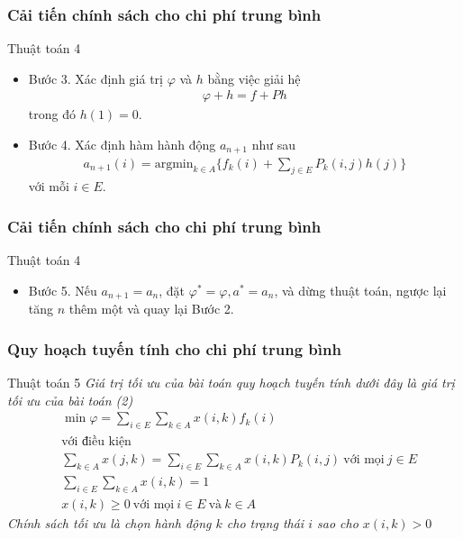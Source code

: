 \documentclass[12pt]{beamer}
\begin{document}
\begin{frame}
	\frametitle{ Cải tiến chính sách cho chi phí trung bình}
	\begin{block}{Thuật toán 4}
		\begin{itemize}
			\item
	 	Bước 3. Xác định giá trị $\varphi$ và $h$ bằng việc giải hệ
	\begin{align*}
	\varphi +h=f +Ph
	\end{align*} 
	trong đó $h(1)=0$.
	
\item
	Bước 4. Xác định hàm hành động $a_{n+1}$ như sau
	\begin{align*}
	a_{n+1}(i)=\mathrm{argmin}_{k \in A}\{f_k(i)+\sum_{j\in E}P_k(i,j)h(j)\}
	\end{align*}
	với mỗi $i \in E$.

		\end{itemize}
	\end{block}
\end{frame}

\begin{frame}
	\frametitle{ Cải tiến chính sách cho chi phí trung bình}
	\begin{block}{Thuật toán 4}
		\begin{itemize}
			\item
			Bước 5.
			Nếu $a_{n+1}=a_n$, đặt $\varphi^*=\varphi, a^*=a_n$, và dừng thuật toán, ngược lại tăng $n$ thêm một và quay lại Bước 2.
		\end{itemize}
	\end{block}
\end{frame}


\begin{frame}
	\frametitle{Quy hoạch tuyến tính cho chi phí trung bình}
\begin{block}{Thuật toán 5}
   \textit {Giá trị tối ưu của bài toán quy hoạch tuyến tính dưới đây là giá trị tối ưu của bài toán (2)
	\begin{align*}
	&\min \varphi =\sum_{i \in E} \sum_{k \in A}x(i,k)f_k(i)\\
	&\text{với điều kiện}\\
	&\sum_{k \in A}x(j,k)=\sum_{i \in E}\sum_{k \in A}x(i,k)P_k(i,j) \ \text{với mọi} \ j \in E\\
	&\sum_{i \in E}\sum_{k \in A}x(i,k)=1\\
	&x(i,k) \geq 0 \ \text{với mọi} \ i\in E \ \text{và} \ k\in A
	\end{align*}
	Chính sách tối ưu là chọn hành động $k$ cho trạng thái $i$ sao cho $x(i,k)>0$
}
	\end{block}
\end{frame}
\end{document}
